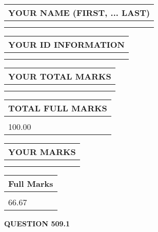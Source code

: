 \documentclass{ctexart}
\begin{document}
   
   
   
\newpage 
\setcounter{page}{ 
   509001 } 
   
   
   
   
\noindent\begin{tabular}{|l|}
\hline
YOUR NAME (FIRST, ... LAST)  \\
\hline
 \\ 
 \\ 
\hline
\end{tabular}
\hspace{0.05in} \begin{tabular}{|l|}
\hline
 YOUR   ID   INFORMATION  \\
\hline
 \\ 
 \\ 
\hline
\end{tabular}
   
   
\vspace{0.2in}\noindent\begin{tabular}{|l|}
\hline
YOUR TOTAL MARKS  \\
\hline
 \\ 
 \\ 
\hline
\end{tabular}
\hspace{0.05in} \begin{tabular}{|l|}
\hline
TOTAL FULL MARKS  \\
\hline
 \\ 
100.00 \\
\hline
\end{tabular}
   
   
 \vspace{0.2in}
 
 
 
 
   
   
  
\vspace{0.2in}
  
\noindent\begin{tabular}{|l|}
\hline
 YOUR MARKS  \\
\hline
 \\ 
 \\ 
\hline
\end{tabular}
\hspace{0.05in} \begin{tabular}{|l|}
\hline
 Full Marks  \\
\hline
 \\ 
66.67 \\
\hline
\end{tabular}
{\textbf{\Large{QUESTION
509.1 
}}}
  
\end{document}
